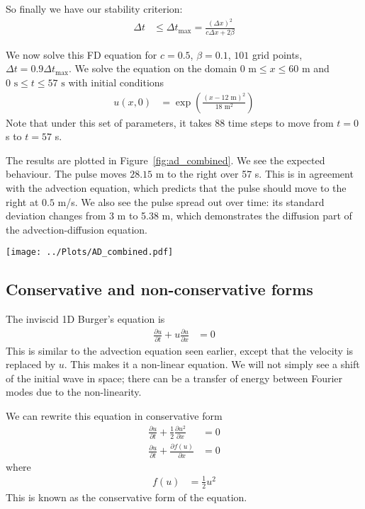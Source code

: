 \documentclass[twocolumn]{myarticle}
\begin{document}
So finally we have our stability criterion:
\begin{align}
    \Delta t &\leq \Delta t_\text{max} = \frac{(\Delta x)^2}{c \Delta x + 2 \beta}
\end{align}

We now solve this FD equation for $ c = 0.5 $, $ \beta = 0.1 $, $ 101 $ grid points, $ \Delta t = 0.9 \Delta t_\text{max} $.
We solve the equation on the domain $ 0 \text{ m} \leq x \leq 60 \text{ m} $ and $ 0 \text{ s} \leq t \leq 57 \text{ s} $ with initial conditions
\begin{align}
    u(x, 0) &= \exp \left( \frac{(x - 12 \text{ m})^2}{18 \text{ m}^2} \right)
\end{align}
Note that under this set of parameters, it takes 88 time steps to move from $ t = 0 $ s to $ t = 57 $ s.

The results are plotted in Figure~\ref{fig:ad_combined}.
We see the expected behaviour.
The pulse moves $ 28.15 $ m to the right over 57 s.
This is in agreement with the advection equation, which predicts that the pulse should move to the right at $ 0.5 $ m/s.
We also see the pulse spread out over time: its standard deviation changes from 3 m to 5.38 m, which demonstrates the diffusion part of the advection-diffusion equation.

\begin{figure*}[ht]
    \centering
    \texttt{[image: ../Plots/AD\_combined.pdf]}
    \caption{Solution to the combined advection-diffusion equation.}
    \label{fig:ad_combined}
\end{figure*}

\subsection{Conservative and non-conservative forms}
\label{subsec:conservative_and_non_conservative_forms}

The inviscid 1D Burger's equation is
\begin{align}
    \frac{\partial u}{\partial t} + u \frac{\partial u}{\partial x} &= 0
\end{align}
This is similar to the advection equation seen earlier, except that the velocity is replaced by $ u $.
This makes it a non-linear equation.
We will not simply see a shift of the initial wave in space; there can be a transfer of energy between Fourier modes due to the non-linearity.

We can rewrite this equation in conservative form
\begin{align}
    \frac{\partial u}{\partial t} + \frac{1}{2} \frac{\partial u^2}{\partial x} &= 0
    \\
    \frac{\partial u}{\partial t} + \frac{\partial f(u)}{\partial x} &= 0
\end{align}
where
\begin{align}
    f(u) &= \frac{1}{2} u^2
\end{align}
This is known as the conservative form of the equation.
\end{document}

